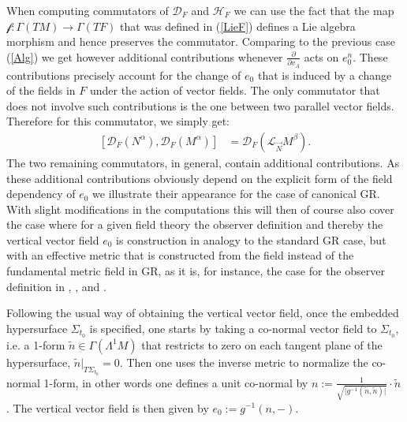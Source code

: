 \documentclass[a4paper,12pt, DIV=14, BCOR=5mm, twoside, headsepline, numbers=noenddot]{scrbook}
\begin{document}
When computing commutators of $\mathcal{D}_F$ and $\mathcal{H}_F$ we can use the fact that the map $\mathcal{f}: \Gamma(TM) \rightarrow \Gamma(TF)$ that was defined in (\ref{LieF}) defines a Lie algebra morphism and hence preserves the commutator.
Comparing to the previous case (\ref{Alg}) we get however additional contributions whenever $\frac{\partial}{\partial v_A}$ acts on $e_0^n$. These contributions precisely account for the change of $e_0$ that is induced by a change of the fields in $F$ under the action of vector fields. The only commutator that does not involve such contributions is the one between two parallel vector fields. Therefore for this commutator, we simply get:
\begin{align}\label{FDD}
    \left [ \mathcal{D}_F(N^{\alpha}), \mathcal{D}_F(M^{\alpha})\right ] &= \mathcal{D}_F(\mathcal{L}_{\vec{N}}M^{\beta}).
\end{align}
The two remaining commutators, in general, contain additional contributions. As these additional contributions obviously depend on the explicit form of the field dependency of $e_0$ we illustrate their appearance for the case of canonical GR. With slight modifications in the computations this will then of course also cover the case where for a given field theory the observer definition and thereby the vertical vector field $e_0$ is construction in analogy to the standard GR case, but with an effective metric that is constructed from the field instead of the fundamental metric field in GR, as it is, for instance, the case for the observer definition in \cite{2018PhRvD..97h4036D}, \cite{2011PhRvD..83d4047R}, and \cite{Rivera}.

Following the usual way of obtaining the vertical vector field, once the embedded hypersurface $\Sigma_{t_0}$ is specified, one starts by taking a co-normal vector field to $\Sigma_{t_0}$, i.e. a 1-form $\tilde{n} \in \Gamma(\Lambda^1M)$ that restricts to zero on each tangent plane of the hypersurface, $\tilde{n} \vert_{T\Sigma_{t_0}} = 0$. Then one uses the inverse metric to normalize the co-normal 1-form, in other words one defines a unit co-normal by $n := \frac{1}{\sqrt{ \vert g^{-1}(\tilde{n},\tilde{n}) \vert }} \cdot \tilde{n}$. The vertical vector field is then given by $e_0 := g^{-1}(n, - )$. 
\end{document}

